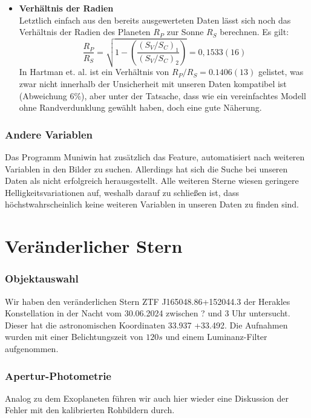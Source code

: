 \documentclass[ngerman,ruledheaders=section,class=report,thesis={type=Protokoll},accentcolor=1b,marginpar=false,parskip=half-,fontsize=11pt,]{tudapub}
\begin{document}
\begin{itemize}
		\item \textbf{Verhältnis der Radien} \\
		Letztlich einfach aus den bereits ausgewerteten Daten lässt sich noch das Verhältnis der Radien des Planeten $R_P$ zur Sonne $R_S$ berechnen. Es gilt:
		\begin{equation}
			\frac{R_P}{R_S} = \sqrt{1 - \left( \frac{(S_V / S_C)_1}{(S_V / S_C)_2}\right)} = 0,1533(16)
		\end{equation}
		In Hartman et. al. \cite{hartman2009hat} ist ein Verhältnis von $R_P / R_S = 0.1406(13)$ gelistet, was zwar nicht innerhalb der Unsicherheit mit unseren Daten kompatibel ist (Abweichung 6\%), aber unter der Tatsache, dass wie ein vereinfachtes Modell ohne Randverdunklung gewählt haben, doch eine gute Näherung.  
	\end{itemize}
	\subsection{Andere Variablen}
	Das Programm Muniwin hat zusätzlich das Feature, automatisiert nach weiteren Variablen in den Bilder zu suchen. Allerdings hat sich die Suche bei unseren Daten als nicht erfolgreich herausgestellt. Alle weiteren Sterne wiesen geringere Helligkeitsvariationen auf, weshalb darauf zu schließen ist, dass höchstwahrscheinlich keine weiteren Variablen in unseren Daten zu finden sind. 
	
	
	
	\chapter{Veränderlicher Stern} 
	
	\subsection{Objektauswahl} 
	Wir haben den veränderlichen Stern ZTF J165048.86+152044.3 der Herakles Konstellation in der Nacht vom 30.06.2024 zwischen ? und 3 Uhr untersucht. Dieser hat die astronomischen Koordinaten 33.937 +33.492. 
	Die Aufnahmen wurden mit einer Belichtungszeit von $120\si{s}$ und einem Luminanz-Filter aufgenommen.
	
	\subsection{Apertur-Photometrie}
	Analog zu dem Exoplaneten führen wir auch hier wieder eine Diskussion der Fehler mit den kalibrierten Rohbildern durch.
	
\end{document}
